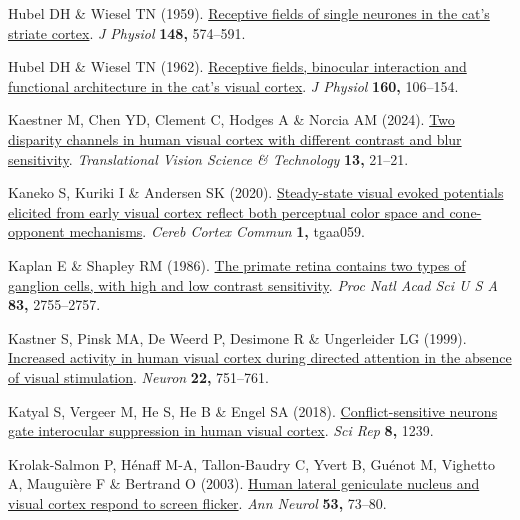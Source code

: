 \documentclass[
  letterpaper,
  DIV=11,
  numbers=noendperiod]{scrartcl}
\newlength{\cslhangindent}
\newenvironment{CSLReferences}[2] %
 {\begin{list}{}{%
  \setlength{\itemindent}{0pt}
  \setlength{\leftmargin}{0pt}
  \setlength{\parsep}{0pt}
  \ifodd #1
   \setlength{\leftmargin}{\cslhangindent}
   \setlength{\itemindent}{-1\cslhangindent}
  \fi
  \setlength{\itemsep}{#2\baselineskip}}}
 {\end{list}}
\begin{document}
\begin{CSLReferences}{1}{1}
Hubel DH \& Wiesel TN (1959).
\href{https://doi.org/10.1113/jphysiol.1959.sp006308}{Receptive fields
of single neurones in the cat's striate cortex}. \emph{J Physiol}
\textbf{148,} 574--591.

Hubel DH \& Wiesel TN (1962).
\href{https://doi.org/10.1113/jphysiol.1962.sp006837}{Receptive fields,
binocular interaction and functional architecture in the cat's visual
cortex}. \emph{J Physiol} \textbf{160,} 106--154.

Kaestner M, Chen YD, Clement C, Hodges A \& Norcia AM (2024).
\href{https://doi.org/10.1167/tvst.13.2.21}{Two disparity channels in
human visual cortex with different contrast and blur sensitivity}.
\emph{Translational Vision Science \& Technology} \textbf{13,} 21--21.

Kaneko S, Kuriki I \& Andersen SK (2020).
\href{https://doi.org/10.1093/texcom/tgaa059}{Steady-state visual evoked
potentials elicited from early visual cortex reflect both perceptual
color space and cone-opponent mechanisms}. \emph{Cereb Cortex Commun}
\textbf{1,} tgaa059.

Kaplan E \& Shapley RM (1986).
\href{https://doi.org/10.1073/pnas.83.8.2755}{The primate retina
contains two types of ganglion cells, with high and low contrast
sensitivity}. \emph{Proc Natl Acad Sci U S A} \textbf{83,} 2755--2757.

Kastner S, Pinsk MA, De Weerd P, Desimone R \& Ungerleider LG (1999).
\href{https://doi.org/10.1016/s0896-6273(00)80734-5}{Increased activity
in human visual cortex during directed attention in the absence of
visual stimulation}. \emph{Neuron} \textbf{22,} 751--761.

Katyal S, Vergeer M, He S, He B \& Engel SA (2018).
\href{https://doi.org/10.1038/s41598-018-19809-w}{Conflict-sensitive
neurons gate interocular suppression in human visual cortex}. \emph{Sci
Rep} \textbf{8,} 1239.

Krolak-Salmon P, Hénaff M-A, Tallon-Baudry C, Yvert B, Guénot M,
Vighetto A, Mauguière F \& Bertrand O (2003).
\href{https://doi.org/10.1002/ana.10403}{Human lateral geniculate
nucleus and visual cortex respond to screen flicker}. \emph{Ann Neurol}
\textbf{53,} 73--80.


\end{CSLReferences}
\end{document}
